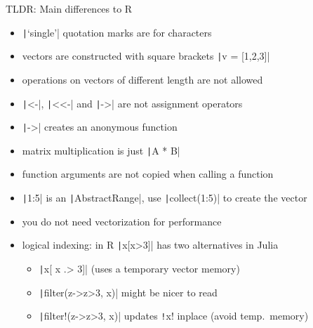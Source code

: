 \documentclass[aspectratio=169, 11pt, handout]{beamer}
\begin{document}
    \begin{frame}[fragile]{TLDR: Main differences to R}
        \begin{itemize}
            \item \texttt|‘single’| quotation marks are for characters
            \pause
            \item vectors are constructed with square brackets \texttt|v = [1,2,3]|
            \pause
            \item operations on vectors of different length are not allowed
            \pause
            \item \texttt|<-|, \texttt|<<-| and \texttt|->| are not assignment operators
            \pause
            \item \texttt|->| creates an anonymous function
            \pause
            \item matrix multiplication is just \texttt|A * B|
            \pause
            \item function arguments are not copied when calling a function
            \pause
            \item \texttt|1:5| is an \texttt|AbstractRange|, use \texttt|collect(1:5)| to create the vector
            \pause
            \item you do not need vectorization for performance
            \pause
            \item logical indexing: in R \texttt|x[x>3]| has two alternatives in Julia
            \begin{itemize}
                \item \texttt|x[ x .> 3]| (uses a temporary vector memory)
                \item \texttt|filter(z->z>3, x)| might be nicer to read
                \item \texttt|filter!(z->z>3, x)| updates \texttt!x! inplace (avoid temp.~memory)
            \end{itemize}
        \end{itemize}
    \end{frame}
\end{document}
